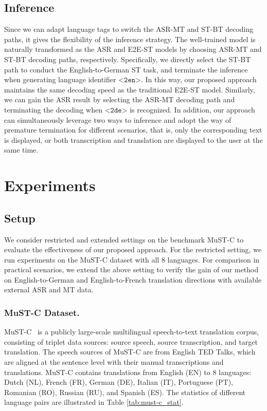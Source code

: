 \documentclass[letterpaper]{article} %
\begin{document}
\subsection*{Inference}
Since we can adapt language tags to switch the ASR-MT and ST-BT decoding paths, it gives the flexibility of the inference strategy.
The well-trained model is naturally transformed as the ASR and E2E-ST models by choosing ASR-MT and ST-BT decoding paths, respectively.
Specifically, we directly select the ST-BT path to conduct the English-to-German ST task, and terminate the inference when generating language identifier $\texttt{<2en>}$.
In this way, our proposed approach maintains the same decoding speed as the traditional E2E-ST model.
Similarly, we can gain the ASR result by selecting the ASR-MT decoding path and terminating the decoding when $\texttt{<2de>}$ is recognized.
In addition, our approach can simultaneously leverage two ways to inference and adopt the way of premature termination for different scenarios, that is, only the corresponding text is displayed, or both transcription and translation are displayed to the user at the same time.


\section{Experiments}

\subsection*{Setup}

We consider restricted and extended settings on the benchmark MuST-C to evaluate the effectiveness of our proposed approach.
For the restricted setting, we run experiments on the MuST-C dataset with all 8 languages.
For comparison in practical scenarios, we extend the above setting to verify the gain of our method on English-to-German and English-to-French translation directions with available external ASR and MT data.

\subsubsection{MuST-C Dataset.}
MuST-C~\cite{Gangi2019MuSTCAM} is a publicly large-scale multilingual speech-to-text translation corpus, consisting of triplet data sources: source speech, source transcription, and target translation.
The speech sources of MuST-C are from English TED Talks, which are aligned at the sentence level with their manual transcriptions and translations.
MuST-C contains translations from English (EN) to 8 languages: Dutch (NL), French (FR), German (DE), Italian (IT), Portuguese (PT), Romanian (RO), Russian (RU), and Spanish (ES).
The statistics of different language pairs are illustrated in Table \ref{tab:must-c_stat}.
\end{document}
